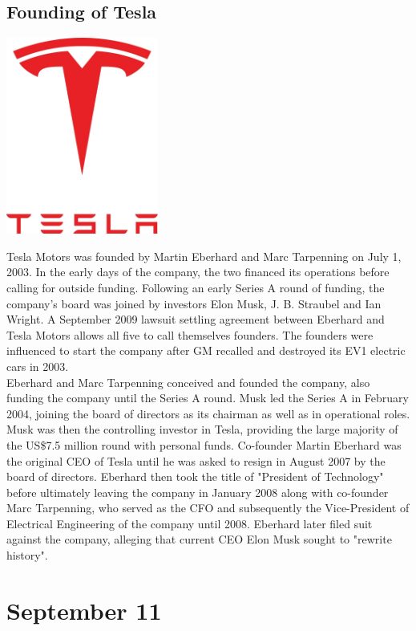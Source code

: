 \documentclass[11pt]{report}
\begin{document}
\subsection{Founding of Tesla}
\vspace{2mm}\begin{center}\includegraphics[width=5cm]{./img/teslaLogo.jpg}\end{center}
Tesla Motors was founded by Martin Eberhard and Marc Tarpenning on July 1, 2003. In the early days of the company, the two financed its operations before calling for outside funding. Following an early Series A round of funding, the company's board was joined by investors Elon Musk, J. B. Straubel and Ian Wright. A September 2009 lawsuit settling agreement between Eberhard and Tesla Motors allows all five to call themselves founders. The founders were influenced to start the company after GM recalled and destroyed its EV1 electric cars in 2003.\\ \indent Eberhard and Marc Tarpenning conceived and founded the company, also funding the company until the Series A round. Musk led the Series A in February 2004, joining the board of directors as its chairman as well as in operational roles. Musk was then the controlling investor in Tesla, providing the large majority of the US\$7.5 million round with personal funds. Co-founder Martin Eberhard was the original CEO of Tesla until he was asked to resign in August 2007 by the board of directors. Eberhard then took the title of "President of Technology" before ultimately leaving the company in January 2008 along with co-founder Marc Tarpenning, who served as the CFO and subsequently the Vice-President of Electrical Engineering of the company until 2008. Eberhard later filed suit against the company, alleging that current CEO Elon Musk sought to "rewrite history".
\section{September 11}
\end{document}
